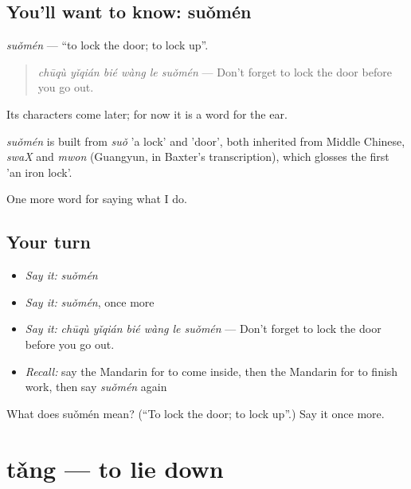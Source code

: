 \subsection*{You'll want to know: suǒmén}
\emph{suǒmén} — \textquotedblleft{}to lock the door; to lock up\textquotedblright{}.

\begin{quote}
\emph{chūqù yǐqián bié wàng le suǒmén} — Don't forget to lock the door before you go out.
\end{quote}

Its characters come later; for now it is a word for the ear.

\begin{cousinweb}
\emph{suǒmén} is built from \emph{suǒ} 'a lock' and  'door', both inherited from Middle Chinese, \emph{swaX} and \emph{mwon} (Guangyun, in Baxter's transcription), which glosses the first 'an iron lock'.
\end{cousinweb}

\begin{grammarlens}[title={What you've built}]
One more word for saying what I do.
\end{grammarlens}

\subsection*{Your turn}
\begin{itemize}
\raggedright
  \item \emph{Say it:} \emph{suǒmén}
  \item \emph{Say it:} \emph{suǒmén}, once more
  \item \emph{Say it:} \emph{chūqù yǐqián bié wàng le suǒmén} — Don't forget to lock the door before you go out.
  \item \emph{Recall:} say the Mandarin for to come inside, then the Mandarin for to finish work, then say \emph{suǒmén} again
\end{itemize}

\begin{tcolorbox}[breakable,colback=teal!4,colframe=teal!35!black,title={Before you move on}]
What does suǒmén mean? (\textquotedblleft{}To lock the door; to lock up\textquotedblright{}.) Say it once more.
\end{tcolorbox}
\section[tǎng]{tǎng — to lie down}

